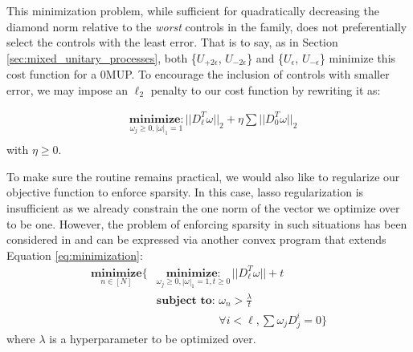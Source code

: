 \documentclass[aps,nofootinbib,pra,notitlepage,twocolumn]{revtex4-1}
\begin{document}
This minimization problem, while sufficient for quadratically decreasing the diamond norm relative to the \textit{worst} controls in the family, does not preferentially select the controls with the least error. That is to say, as in Section \ref{sec:mixed_unitary_processes}, both \{$U_{+2\epsilon}$, $U_{-2\epsilon}$\} and \{$U_{\epsilon}$, $U_{-\epsilon}$\} minimize this cost function for a 0MUP. To encourage the inclusion of controls with smaller error, we may impose an $\ell_2$ penalty to our cost function by rewriting it as:

\begin{equation}\label{eq:minimization_l2}
  \begin{split}
    &\underset{\omega_j\geq0, |\omega|_1=1}{\textbf{minimize}: } ||D_{\ell}^T\omega||_2 + \eta\sum||D_0^T\omega||_2\\
  \end{split}
\end{equation}
with $\eta \geq 0$. 

To make sure the routine remains practical, we would also like to regularize our objective function to enforce sparsity. In this case, lasso regularization \cite{tibshirani1996regression} is insufficient as we already constrain the one norm of the vector we optimize over to be one. However, the problem of enforcing sparsity in such situations has been considered in \cite{NIPS2012_4504} and can be expressed via another convex program that extends Equation \ref{eq:minimization}:
\begin{equation}
\begin{split}
\underset{n\in[N]}{\textbf{minimize}}\{
    &\underset{\omega_j\geq0, |\omega|_1=1, t\geq0}{\textbf{minimize}: } ||D_{\ell}^T\omega|| + t\\
    &\textbf{subject to: } \omega_n > \frac{\lambda}{t}\\
    &\phantom{\textbf{subject to: }} \forall i<\ell, \sum \omega_jD_j^i=0\}
\end{split}
\end{equation} where $\lambda$ is a hyperparameter to be optimized over.


\end{document}
